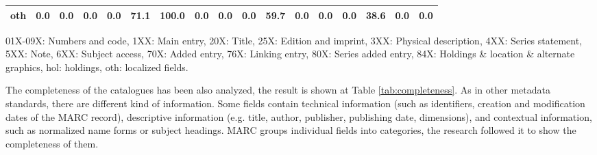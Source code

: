 \begin{table*}
\begin{minipage}{17.5cm}
\begin{center}
\begin{tabular}{lrrrrrrrrrrrrrrrr}
oth & 0.0 & 0.0 & 0.0 & 0.0 & 71.1 & 100.0 & 0.0 & 0.0 & 0.0 & 59.7 & 0.0 & 0.0 & 0.0 & 38.6 & 0.0 & 0.0 \\
\bottomrule
\end{tabular}
\end{center}
\footnotesize
01X-09X: Numbers and code, 1XX: Main entry, 20X: Title, 25X: Edition and imprint, 3XX: Physical description, 4XX: Series statement, 5XX: Note, 6XX: Subject access, 70X: Added entry, 76X: Linking entry, 80X: Series added entry, 84X: Holdings \& location \& alternate graphics, hol: holdings, oth: localized fields.
\end{minipage}
\end{table*}

The completeness of the catalogues has been also analyzed, the result is shown at Table \ref{tab:completeness}. As in other metadata standards, there are different kind of information. Some fields contain technical information (such as identifiers, creation and modification dates of the MARC record), descriptive information (e.g. title, author, publisher, publishing date, dimensions), and contextual information, such as normalized name forms or subject headings. MARC groups individual fields into categories, the research followed it to show the completeness of them.

